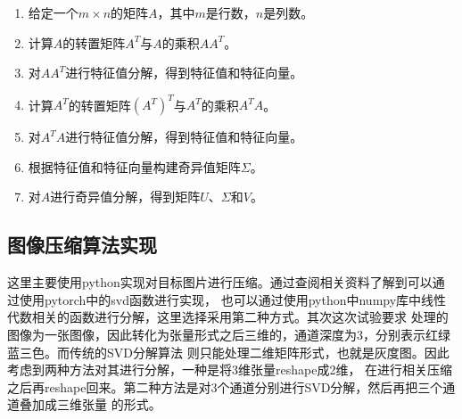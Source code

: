 \documentclass[UTF8]{ctexart}
\begin{document}
\begin{enumerate}
  \item 给定一个$m \times n$的矩阵$A$，其中$m$是行数，$n$是列数。
  \item 计算$A$的转置矩阵$A^T$与$A$的乘积$AA^T$。
  \item 对$AA^T$进行特征值分解，得到特征值和特征向量。
  \item 计算$A^T$的转置矩阵$(A^T)^T$与$A^T$的乘积$A^TA$。
  \item 对$A^TA$进行特征值分解，得到特征值和特征向量。
  \item 根据特征值和特征向量构建奇异值矩阵$\Sigma$。
  \item 对$A$进行奇异值分解，得到矩阵$U$、$\Sigma$和$V$。
\end{enumerate}


\subsection{图像压缩算法实现}
这里主要使用python实现对目标图片进行压缩。通过查阅相关资料了解到可以通过使用pytorch中的svd函数进行实现，
也可以通过使用python中numpy库中线性代数相关的函数进行分解，这里选择采用第二种方式。其次这次试验要求
处理的图像为一张图像，因此转化为张量形式之后三维的，通道深度为3，分别表示红绿蓝三色。而传统的SVD分解算法
则只能处理二维矩阵形式，也就是灰度图。因此考虑到两种方法对其进行分解，一种是将3维张量reshape成2维，
在进行相关压缩之后再reshape回来。第二种方法是对3个通道分别进行SVD分解，然后再把三个通道叠加成三维张量
的形式。
\end{document}
